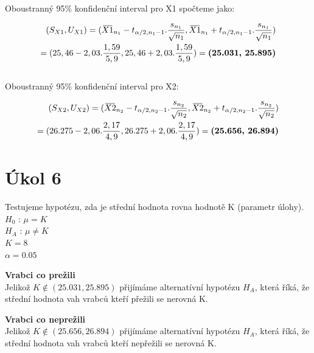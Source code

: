 \documentclass[12pt,a4paper]{article}
\newcommand{\overbar}[1]{\mkern 2.5mu\overline{\mkern-2.5mu#1\mkern-2.5mu}\mkern 2.5mu}
\begin{document}
Oboustranný 95\% konfidenční interval pro X1 spočteme jako:

\begin{gather}
\begin{align}
(S_{X1},U_{X1})
= (\overbar{X1}_{n_1} - t_{\alpha/2,n_1-1}.\frac{s_{n_1}}{\sqrt{n_1}},
  \overbar{X1}_{n_1} + t_{\alpha/2,n_1-1}.\frac{s_{n_1}}{\sqrt{n_1}}) \nonumber\\
= (25,46 - 2,03.\frac{1,59}{5,9},
   25,46 + 2,03.\frac{1,59}{5,9})
= \textbf{(25.031, 25.895)}
\end{align}
\end{gather}\\

Oboustranný 95\% konfidenční interval pro X2:

\begin{align}
(S_{X2},U_{X2}) = 
(\overbar{X2}_{n_2} - t_{\alpha/2,n_2-1}.\frac{s_{n_2}}{\sqrt{n_2}},
 \overbar{X2}_{n_2} + t_{\alpha/2,n_2-1}.\frac{s_{n_2}	}{\sqrt{n_2}}) \nonumber\\
= (26.275 - 2,06.\frac{2,17}{4,9},
   26.275 + 2,06.\frac{2,17}{4,9})
= \textbf{(25.656, 26.894)}
\end{align}

\section{Úkol 6}
Testujeme hypotézu, zda je střední hodnota rovna hodnotě K (parametr úlohy).\\[0.4cm]
$H_0$ : $\mu = K$\\
$H_A$ : $\mu \neq K$\\
$K = 8$\\
$\alpha = 0.05$\par \medskip
\textbf{Vrabci co prežili}\\
Jelikož $K \notin (25.031, 25.895)$ přijímáme alternatívní hypotézu $H_A$, která říká, že střední hodnota vah vrabců kteří přežili se nerovná K.
\par \medskip
\textbf{Vrabci co neprežili}\\
Jelikož $K \notin (25.656, 26.894)$ přijímáme alternatívní hypotézu $H_A$, která říká, že střední hodnota vah vrabců kteří nepřežili se nerovná K.
\end{document}
